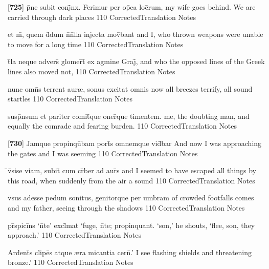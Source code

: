 \latline
  {[\textbf{725}] p\={}ne subit conj\={}nx.  Ferimur per op\={}ca loc\={}rum,}
  { my wife goes behind.  We are carried through dark places }
  {110}
  { CorrectedTranslation }
  { Notes }


\latline
  {et m\={}, quem d\={}dum n\={}n\={}lla injecta mov\={}bant}
  { and I, who thrown weapons were unable to move for a long time}
  {110}
  { CorrectedTranslation }
  { Notes }


\latline
  {t\={}la neque advers\={} glomer\={}t\={\macron {\i}} ex agmine Graj\={\macron {\i}},}
  { and who the opposed lines of the Greek lines also moved not,  }
  {110}
  { CorrectedTranslation }
  { Notes }


\latline
  {nunc omn\={}s terrent aur{\ae}, sonus excitat omnis}
  { now all breezes terrify, all sound startles }
  {110}
  { CorrectedTranslation }
  { Notes }


\latline
  {susp\={}nsum et pariter comit\={\macron {\i}}que oner\={\macron {\i}}que timentem.}
  { me, the doubting man, and equally the comrade and fearing burden. }
  {110}
  { CorrectedTranslation }
  { Notes }


\latline
  {[\textbf{730}] Jamque propinqu\={}bam port\={\macron {\i}}s omnemque vid\={}bar}
  { And now I was approaching the gates and I was seeming  }
  {110}
  { CorrectedTranslation }
  { Notes }


\latline
  {\={}v\={}sise viam, subit\={} cum cr\={}ber ad aur\={\macron {\i}}s}
  { and I seemed to have escaped all things by this road, when suddenly from the air a sound }
  {110}
  { CorrectedTranslation }
  { Notes }


\latline
  {v\={\macron {\i}}sus adesse pedum sonitus, genitorque per umbram}
  { of crowded footfalls comes and my father, seeing through the shadows  }
  {110}
  { CorrectedTranslation }
  { Notes }


\latline
  {pr\={}spici\={}ns `n\={}te' excl\={}mat `fuge, n\={}te; propinquant.}
  { `son,' he shouts, `flee, son, they approach.' }
  {110}
  { CorrectedTranslation }
  { Notes }


\latline
  {Ardent\={\macron {\i}}s clipe\={}s atque {\ae}ra micantia cern\={}.'}
  { I see flashing shields and threatening bronze.' }
  {110}
  { CorrectedTranslation }
  { Notes }


